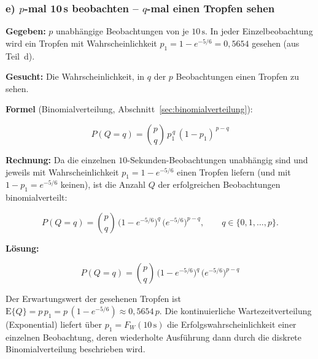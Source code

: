 \subsubsection*{e) $p$-mal 10\,s beobachten -- $q$-mal einen Tropfen sehen}

\begin{beispiel}

\textbf{Gegeben:} $p$ unabhängige Beobachtungen von je $10\,\mathrm{s}$. In jeder
Einzelbeobachtung wird ein Tropfen mit Wahrscheinlichkeit
$p_1 = 1 - e^{-5/6} = 0{,}5654$ gesehen (aus Teil~d).

\textbf{Gesucht:} Die Wahrscheinlichkeit, in $q$ der $p$ Beobachtungen einen
Tropfen zu sehen.

\textbf{Formel} (Binomialverteilung, Abschnitt~\ref{sec:binomialverteilung}):

$$
P(Q = q) = \binom{p}{q}\, p_1^{\,q}\, (1 - p_1)^{\,p - q}
$$

\textbf{Rechnung:} Da die einzelnen $10$-Sekunden-Beobachtungen unabhängig sind
und jeweils mit Wahrscheinlichkeit $p_1 = 1 - e^{-5/6}$ einen Tropfen liefern
(und mit $1 - p_1 = e^{-5/6}$ keinen), ist die Anzahl $Q$ der erfolgreichen
Beobachtungen binomialverteilt:

$$
P(Q = q) = \binom{p}{q}\, \bigl(1 - e^{-5/6}\bigr)^{q}\,
\bigl(e^{-5/6}\bigr)^{p - q}, \qquad q \in \{0, 1, \dots, p\}.
$$

\textbf{Lösung:}

$$
\boxed{\;P(Q = q) = \binom{p}{q}\, \bigl(1 - e^{-5/6}\bigr)^{q}\,
\bigl(e^{-5/6}\bigr)^{p - q}\;}
$$

Der Erwartungswert der gesehenen Tropfen ist
$\mathrm{E}\{Q\} = p\, p_1 = p\,(1 - e^{-5/6}) \approx 0{,}5654\, p$. Die
kontinuierliche Wartezeitverteilung (Exponential) liefert über
$p_1 = F_W(10\,\mathrm{s})$ die Erfolgswahrscheinlichkeit einer einzelnen
Beobachtung, deren wiederholte Ausführung dann durch die diskrete
Binomialverteilung beschrieben wird.

\end{beispiel}
